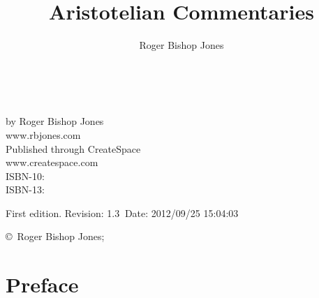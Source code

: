 \newcommand{\indexentry}[2]{\item #1 #2}

\newcommand{\ignore}[1]{}

\title{Aristotelian Commentaries}
\author{Roger Bishop Jones}
\date{\ }




\frontmatter

\begin{titlepage}
\maketitle

\hspace{2in}

\vfill

\begin{centering}

\vfill

\vspace{0.1in}
by Roger Bishop Jones\\
www.rbjones.com\\
\vspace{0.2in}
Published through CreateSpace\\
www.createspace.com\\
\vspace{0.2in}
ISBN-10: \\
ISBN-13: \\
\vspace{0.2in}

{\footnotesize

First edition. $ $Revision: 1.3 $~$Date: 2012/09/25 15:04:03 $ $

\copyright\ Roger Bishop Jones;

}%

\end{centering}

\thispagestyle{empty}
\end{titlepage}

{\parskip=0pt\tableofcontents}

\vfill

\pagebreak

\chapter*{Preface}

